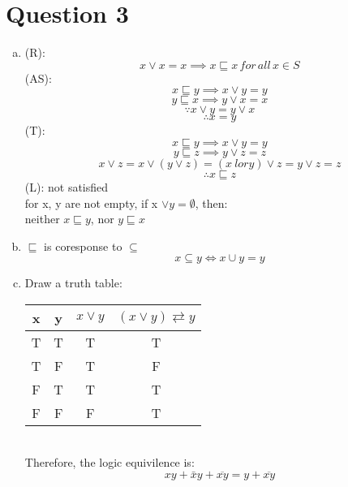 \documentclass[11pt, a4paper]{article}
\begin{document}
\section*{Question 3}
\begin{enumerate}[(a)]
    \item
    (R):
    $$ x \lor x = x \implies x \sqsubseteq x \,  for\, all\, x \in S $$
    (AS):
    $$ x \sqsubseteq y \implies x \lor y = y $$
    $$ y \sqsubseteq x \implies y \lor x = x $$
    $$ \because x \lor y =y \lor x$$
    $$ \therefore x =y $$
    (T):
    $$ x \sqsubseteq y \implies x \lor y = y $$
    $$ y \sqsubseteq z \implies y \lor z = z $$
    $$ x \lor z = x \lor (y \lor z) = (x \ lor y) \lor z = y \lor z = z $$
    $$ \therefore x \sqsubseteq z $$
    (L): not satisfied\\
    for x, y are not empty, if x $\lor y = \emptyset $, then:\\
    neither $x \sqsubseteq y$, nor $ y \sqsubseteq x $
    \item
    $ \sqsubseteq $ is coresponse to $ \subseteq $
    $$ x \subseteq y \iff x \cup y = y $$
    \item
    Draw a truth table:\\
    \begin{tabular}{ | c | c | c | c |}
        \hline
        x & y & $x \lor y$ & $ (x \lor y ) \rightleftarrows y$\\
        \hline
        T & T & T & T\\
        \hline
        T & F & T & F\\
        \hline
        F & T & T & T\\
        \hline
        F & F & F & T\\
        \hline
        \end{tabular}\\
        Therefore, the logic equivilence is:
        $$ xy + \bar{x}y + \overline{xy} = y + \overline{xy}$$
\end{enumerate}
\end{document}
